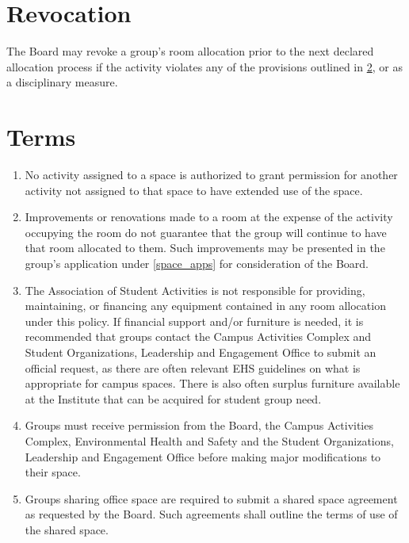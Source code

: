 \documentclass[12pt]{article}
\begin{document}
\section{Revocation}
The Board may revoke a group's room allocation prior to the next declared allocation process if the
    activity violates any of the provisions outlined in \ref{space_app_terms}, or as a disciplinary measure.

\section{Terms}
\label{space_app_terms}
\begin{enumerate}
    \item No activity assigned to a space is authorized to grant permission for another activity
        not assigned to that space to have extended use of the space.
    
    \item Improvements or renovations made to a room at the expense of the activity occupying the
        room do not guarantee that the group will continue to have that room allocated to them.
    Such improvements may be presented in the group's application under \ref{space_apps} for
        consideration of the Board.
    
    \item The Association of Student Activities is not responsible for providing, maintaining, or
        financing any equipment contained in any room allocation under this policy.
    If financial support and/or furniture is needed, it is recommended that groups contact the
        Campus Activities Complex and Student Organizations, Leadership and Engagement Office to submit
        an official request, as there are often relevant EHS guidelines on what is appropriate for
        campus spaces.
    There is also often surplus furniture available at the Institute that can be acquired for student group need.

    \item Groups must receive permission from the Board, the Campus Activities Complex,
        Environmental Health and Safety and the Student Organizations, Leadership and Engagement Office
        before making major modifications to their space.
    
    \item Groups sharing office space are required to submit a shared space agreement as
        requested by the Board. Such agreements shall outline the terms of use of the shared space.


\end{enumerate}
\end{document}
